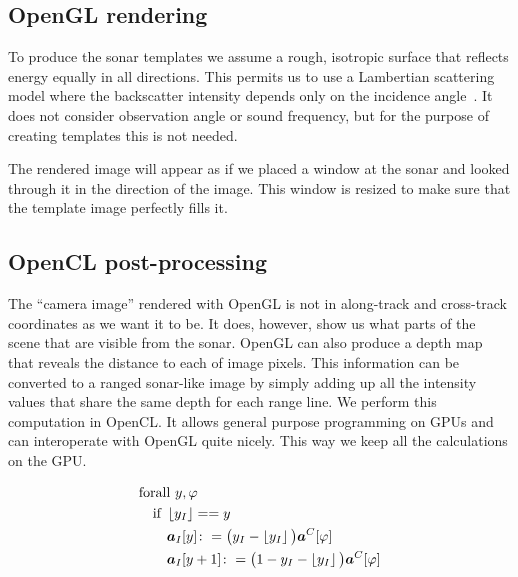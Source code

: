 \subsection{OpenGL rendering}

To produce the sonar templates we assume a rough, isotropic surface that reflects energy equally in all directions. This permits us to use a Lambertian scattering model where the backscatter intensity depends only on the incidence angle~\cite{Zhang1999}. It does not consider observation angle or sound frequency, but for the purpose of creating templates this is not needed.   

The rendered image will appear as if we placed a window at the sonar and looked through it in the direction of the image. This window is resized to make sure that the template image perfectly fills it.



\subsection{OpenCL post-processing}

The ``camera image'' rendered with OpenGL is not in along-track and cross-track coordinates as we want it to be. It does, however, show us what parts of the scene that are visible from the sonar. OpenGL can also produce a depth map that reveals the distance to each of image pixels. This information can be converted to a ranged sonar-like image by simply adding up all the intensity values that share the same depth for each range line. We perform this computation in OpenCL. It allows general purpose programming on GPUs and can interoperate with OpenGL quite nicely. This way we keep all the calculations on the GPU.

\begin{align}
&\text{forall } y,\varphi \nonumber\\
&\quad\text{if }\left\lfloor y_I\right\rfloor == y \nonumber\\
&\qquad\boldsymbol{a}_I[y] \colon= \big(y_I - \left\lfloor y_I\right\rfloor\big)\boldsymbol{a}^C[\varphi] \nonumber\\
&\qquad\boldsymbol{a}_I[y+1] \colon= \big(1 - y_I - \left\lfloor y_I\right\rfloor\big)\boldsymbol{a}^C[\varphi]
\end{align}

